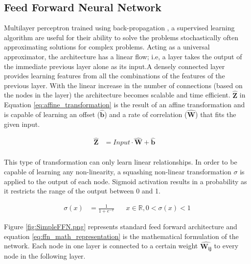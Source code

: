 \documentclass{article}
\let\oldhat\hat
\renewcommand{\hat}[1]{\oldhat{\mathbf{#1}}}
\begin{document}
\subsection{Feed Forward Neural Network}
\label{sssec:ffn}
Multilayer perceptron trained using back-propagation \cite{Rumelhart1986LearningIR}, a supervised learning algorithm are useful for their ability to solve the problems stochastically often approximating solutions for complex problems. Acting as a universal approximator, the architecture has a linear flow; i.e, a layer takes the output of the immediate previous layer alone as its input.A densely connected layer provides learning features from all the combinations of the features of the previous layer. With the linear increase in the number of connections (based on the nodes in the layer) the architecture becomes scalable and time efficient. $\hat{Z}$ in Equation \ref{eq:affine_transformation} is the result of an affine transformation and is capable of learning an offset ($\hat{b}$) and a rate of correlation ($\hat{W}$) that fits the given input.

\begin{equation}
\label{eq:affine_transformation}
\begin{aligned}
\hat{Z} &= Input \cdot \hat{W} + \hat{b}&\\
\end{aligned}
\end{equation}

This type of transformation can only learn linear relationships. In order to be capable of learning any non-linearity, a squashing non-linear transformation $\sigma$ \cite{Han1995TheIO} is applied to the output of each node. Sigmoid activation results in a probability as it restricts the range of the output between 0 and 1.

\begin{equation}
\label{eq:sigmoid_activation}
\begin{aligned}
\sigma(x) &= \frac{1}{1+e^{-x}} \;\;\;\;\;\;  x\in\mathbb{R}, 0<\sigma(x)<1
\end{aligned}
\end{equation}

Figure \ref{fig:SimpleFFN.png} represents standard feed forward architecture and equation \ref{eq:ffn_math_representation} is the mathematical formulation of the network. Each node in one layer is connected to a certain weight $\hat{W_{ij}}$ to every node in the following layer. 
\end{document}
